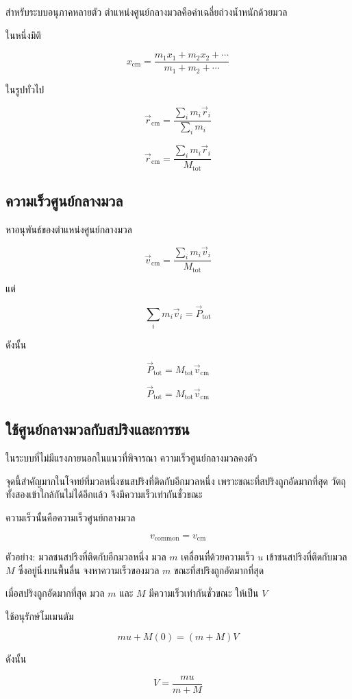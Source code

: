 สำหรับระบบอนุภาคหลายตัว ตำแหน่งศูนย์กลางมวลคือค่าเฉลี่ยถ่วงน้ำหนักด้วยมวล

ในหนึ่งมิติ

\[
x_{\text{cm}}=\frac{m_1x_1+m_2x_2+\cdots}{m_1+m_2+\cdots}
\]

ในรูปทั่วไป

\[
\vec{r}_{\text{cm}}=
\frac{\sum_i m_i\vec{r}_i}{\sum_i m_i}
\]

\begin{tcolorbox}[title=ศูนย์กลางมวล]
\[
\vec{r}_{\text{cm}}=\frac{\sum_i m_i\vec{r}_i}{M_{\text{tot}}}
\]
\end{tcolorbox}

\subsection{ความเร็วศูนย์กลางมวล}

หาอนุพันธ์ของตำแหน่งศูนย์กลางมวล

\[
\vec{v}_{\text{cm}}=\frac{\sum_i m_i\vec{v}_i}{M_{\text{tot}}}
\]

แต่

\[
\sum_i m_i\vec{v}_i=\vec{P}_{\text{tot}}
\]

ดังนั้น

\[
\vec{P}_{\text{tot}}=M_{\text{tot}}\vec{v}_{\text{cm}}
\]

\begin{tcolorbox}[title=โมเมนตัมรวมกับศูนย์กลางมวล]
\[
\vec{P}_{\text{tot}}=M_{\text{tot}}\vec{v}_{\text{cm}}
\]
\end{tcolorbox}

\subsection{ใช้ศูนย์กลางมวลกับสปริงและการชน}

ในระบบที่ไม่มีแรงภายนอกในแนวที่พิจารณา ความเร็วศูนย์กลางมวลคงตัว

จุดนี้สำคัญมากในโจทย์ที่มวลหนึ่งชนสปริงที่ติดกับอีกมวลหนึ่ง เพราะขณะที่สปริงถูกอัดมากที่สุด วัตถุทั้งสองเข้าใกล้กันไม่ได้อีกแล้ว จึงมีความเร็วเท่ากันชั่วขณะ

ความเร็วนั้นคือความเร็วศูนย์กลางมวล

\[
v_{\text{common}}=v_{\text{cm}}
\]

\begin{examplebox}{ตัวอย่าง: มวลชนสปริงที่ติดกับอีกมวลหนึ่ง}
มวล $m$ เคลื่อนที่ด้วยความเร็ว $u$ เข้าชนสปริงที่ติดกับมวล $M$ ซึ่งอยู่นิ่งบนพื้นลื่น จงหาความเร็วของมวล $m$ ขณะที่สปริงถูกอัดมากที่สุด

เมื่อสปริงถูกอัดมากที่สุด มวล $m$ และ $M$ มีความเร็วเท่ากันชั่วขณะ ให้เป็น $V$

ใช้อนุรักษ์โมเมนตัม

\[
mu+M(0)=(m+M)V
\]

ดังนั้น

\[
\boxed{V=\frac{mu}{m+M}}
\]
\end{examplebox}

